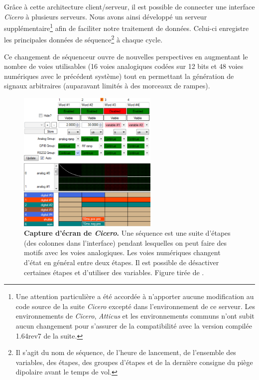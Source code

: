 Grâce à cette architecture client/serveur, il est possible de connecter une interface \emph{Cicero} à plusieurs serveurs. Nous avons ainsi développé un serveur supplémentaire\footnote{Une attention particulière a été accordée à n'apporter aucune modification au code source de la suite \emph{Cicero} excepté dans l'environnement de ce serveur. Les environnements de \emph{Cicero}, \emph{Atticus} et les environnements communs n'ont subit aucun changement pour s'assurer de la compatibilité avec la version compilée 1.64rev7 de la suite.} afin de faciliter notre traitement de données. Celui-ci enregistre les principales données de séquence\footnote{Il s'agit du nom de séquence, de l'heure de lancement, de l'ensemble des variables, des étapes, des groupes d'étapes et de la dernière consigne du piège dipolaire avant le temps de vol.} à chaque cycle.

Ce changement de séquenceur ouvre de nouvelles perspectives en augmentant le nombre de voies utilisables (16 voies analogiques codées sur 12 bits et 48 voies numériques avec le précédent système) tout en permettant la génération de signaux arbitraires (auparavant limités à des morceaux de rampes).

\begin{figure}
\centering
\includegraphics[width=0.6\textwidth]{Fig/Modif_exp/cicero.png}
\caption{\textbf{Capture d'écran de \emph{Cicero}.} Une séquence est une suite d'étapes (des colonnes dans l'interface) pendant lesquelles on peut faire des motifs avec les voies analogiques. Les voies numériques changent d'état en général entre deux étapes. Il est possible de désactiver certaines étapes et d'utiliser des variables. Figure tirée de \citep{keshet2013distributed}.}
\label{fig:cicero}
\end{figure}




